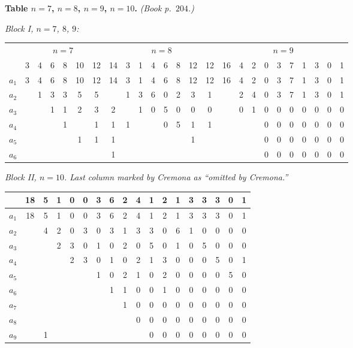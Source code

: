 \documentclass[11pt]{article}
\begin{document}
\medskip

\noindent\textbf{Table $n=7$, $n=8$, $n=9$, $n=10$.} \emph{(Book p.~$204$.)}

\medskip

\noindent\textit{Block I, $n=7$, $8$, $9$:}
\begin{center}\small
\begin{tabular}{l|cccccc|cccccccc|cccccccccc}
& \multicolumn{6}{c|}{$n=7$} & \multicolumn{8}{c|}{$n=8$} & \multicolumn{10}{c}{$n=9$}\\
& 3 & 4 & 6 & 8 & 10 & 12 & 14 & 3 & 1 & 4 & 6 & 8 & 12 & 12 & 16 & 4 & 2 & 0 & 3 & 7 & 1 & 3 & 0 & 1\\
\hline
$a_{1}$ & 3 & 4 & 6 & 8 & 10 & 12 & 14 & 3 & 1 & 4 & 6 & 8 & 12 & 12 & 16 & 4 & 2 & 0 & 3 & 7 & 1 & 3 & 0 & 1\\
$a_{2}$ &   & 1 & 3 & 3 & 5  & 5  &    & 1 & 3 & 6 & 0 & 2 & 3  & 1  &    & 2 & 4 & 0 & 3 & 7 & 1 & 3 & 0 & 1\\
$a_{3}$ &   &   & 1 & 1 & 2  & 3  & 2  &   & 1 & 0 & 5 & 0 & 0  & 0  &    & 0 & 1 & 0 & 0 & 0 & 0 & 0 & 0 & 0\\
$a_{4}$ &   &   &   & 1 &    & 1  & 1  & 1 &   &   & 0 & 5 & 1  & 1  &    &   &   & 0 & 0 & 0 & 0 & 0 & 0 & 0\\
$a_{5}$ &   &   &   &   & 1  & 1  & 1  &   &   &   &   &   & 1  &    &    &   &   & 0 & 0 & 0 & 0 & 0 & 0 & 0\\
$a_{6}$ &   &   &   &   &    &    & 1  &   &   &   &   &   &    &    &    &   &   & 0 & 0 & 0 & 0 & 0 & 0 & 0\\
\end{tabular}
\end{center}

\medskip

\noindent\textit{Block II, $n=10$. Last column marked by Cremona as
``omitted by Cremona.''}
\begin{center}\small
\begin{tabular}{l|ccccccccccccccccc}
& 18 & 5 & 1 & 0 & 0 & 3 & 6 & 2 & 4 & 1 & 2 & 1 & 3 & 3 & 3 & 0 & 1\\
\hline
$a_{1}$ & 18 & 5 & 1 & 0 & 0 & 3 & 6 & 2 & 4 & 1 & 2 & 1 & 3 & 3 & 3 & 0 & 1\\
$a_{2}$ &    & 4 & 2 & 0 & 3 & 0 & 3 & 1 & 3 & 3 & 0 & 6 & 1 & 0 & 0 & 0 & 0\\
$a_{3}$ &    &   & 2 & 3 & 0 & 1 & 0 & 2 & 0 & 5 & 0 & 1 & 0 & 5 & 0 & 0 & 0\\
$a_{4}$ &    &   &   & 2 & 3 & 0 & 1 & 0 & 2 & 1 & 3 & 0 & 0 & 0 & 5 & 0 & 1\\
$a_{5}$ &    &   &   &   &   & 1 & 0 & 2 & 1 & 0 & 2 & 0 & 0 & 0 & 0 & 5 & 0\\
$a_{6}$ &    &   &   &   &   &   & 1 & 1 & 0 & 0 & 1 & 0 & 0 & 0 & 0 & 0 & 0\\
$a_{7}$ &    &   &   &   &   &   &   & 1 & 0 & 0 & 0 & 0 & 0 & 0 & 0 & 0 & 0\\
$a_{8}$ &    &   &   &   &   &   &   &   & 0 & 0 & 0 & 0 & 0 & 0 & 0 & 0 & 0\\
$a_{9}$ &    & 1 &   &   &   &   &   &   &   & 0 & 0 & 0 & 0 & 0 & 0 & 0 & 0\\
\end{tabular}
\end{center}
\end{document}
